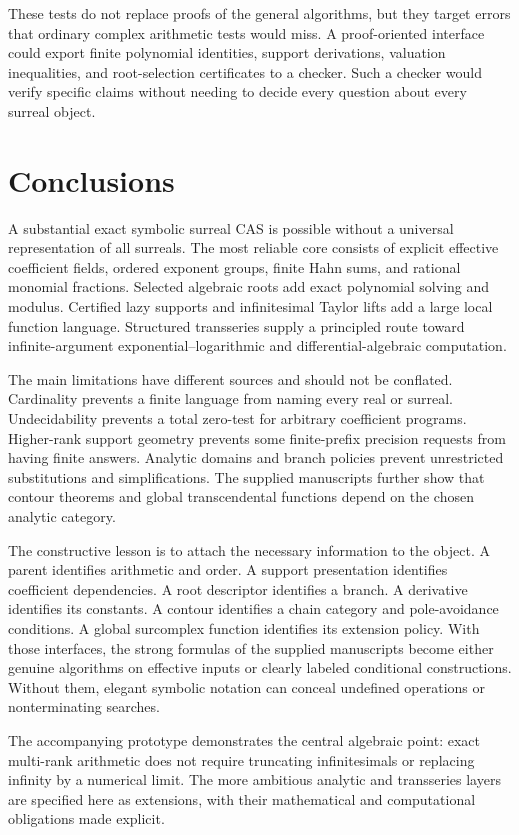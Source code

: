 \documentclass[11pt,letterpaper]{article}
\theoremstyle{definition}\newtheorem{definition}[theorem]{Definition}
\theoremstyle{remark}\newtheorem{remark}[theorem]{Remark}
\numberwithin{equation}{section}\setcounter{tocdepth}{2}
\begin{document}
These tests do not replace proofs of the general algorithms, but they target errors that ordinary complex arithmetic tests would miss. A proof-oriented interface could export finite polynomial identities, support derivations, valuation inequalities, and root-selection certificates to a checker. Such a checker would verify specific claims without needing to decide every question about every surreal object.

\section{Conclusions}\label{sec:conclusions}
A substantial exact symbolic surreal CAS is possible without a universal representation of all surreals. The most reliable core consists of explicit effective coefficient fields, ordered exponent groups, finite Hahn sums, and rational monomial fractions. Selected algebraic roots add exact polynomial solving and modulus. Certified lazy supports and infinitesimal Taylor lifts add a large local function language. Structured transseries supply a principled route toward infinite-argument exponential--logarithmic and differential-algebraic computation.

The main limitations have different sources and should not be conflated. Cardinality prevents a finite language from naming every real or surreal. Undecidability prevents a total zero-test for arbitrary coefficient programs. Higher-rank support geometry prevents some finite-prefix precision requests from having finite answers. Analytic domains and branch policies prevent unrestricted substitutions and simplifications. The supplied manuscripts further show that contour theorems and global transcendental functions depend on the chosen analytic category.

The constructive lesson is to attach the necessary information to the object. A parent identifies arithmetic and order. A support presentation identifies coefficient dependencies. A root descriptor identifies a branch. A derivative identifies its constants. A contour identifies a chain category and pole-avoidance conditions. A global surcomplex function identifies its extension policy. With those interfaces, the strong formulas of the supplied manuscripts become either genuine algorithms on effective inputs or clearly labeled conditional constructions. Without them, elegant symbolic notation can conceal undefined operations or nonterminating searches.

The accompanying prototype demonstrates the central algebraic point: exact multi-rank arithmetic does not require truncating infinitesimals or replacing infinity by a numerical limit. The more ambitious analytic and transseries layers are specified here as extensions, with their mathematical and computational obligations made explicit.
\end{document}
